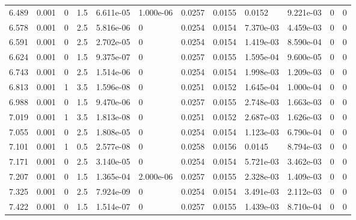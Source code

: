 \documentclass[preview]{standalone}
\begin{document}
{{{\begin{tabular}{L{1.2cm}C{1.2cm} C{0.3cm}C{0.5cm} C{1.4cm}C{1.4cm} C{1.4cm}C{1.4cm} C{1.6cm}C{1.6cm} C{1.6cm}C{1.6cm}}
  6.489  &  0.001  & 0     & 1.5 &  6.611e-05  & 1.000e-06  &  0.0257&   0.0155& 0.0152 & 9.221e-03   &  0 & 0  \\ 
  6.578  &  0.001  & 0     & 2.5 &  5.816e-06  & 0  &  0.0254&   0.0154& 7.370e-03 & 4.459e-03   &  0 & 0  \\ 
  6.591  &  0.001  & 0     & 2.5 &  2.702e-05  & 0  &  0.0254&   0.0154& 1.419e-03 & 8.590e-04   &  0 & 0  \\ 
  6.624  &  0.001  & 0     & 1.5 &  9.375e-07  & 0  &  0.0257&   0.0155& 1.595e-04 & 9.600e-05   &  0 & 0  \\ 
  6.743  &  0.001  & 0     & 2.5 &  1.514e-06  & 0  &  0.0254&   0.0154& 1.998e-03 & 1.209e-03   &  0 & 0  \\ 
  6.813  &  0.001  & 1     & 3.5 &  1.596e-08  & 0  &  0.0251&   0.0152& 1.645e-04 & 1.000e-04   &  0 & 0  \\ 
  6.988  &  0.001  & 0     & 1.5 &  9.470e-06  & 0  &  0.0257&   0.0155& 2.748e-03 & 1.663e-03   &  0 & 0  \\ 
  7.019  &  0.001  & 1     & 3.5 &  1.813e-08  & 0  &  0.0251&   0.0152& 2.687e-03 & 1.626e-03   &  0 & 0  \\ 
  7.055  &  0.001  & 0     & 2.5 &  1.808e-05  & 0  &  0.0254&   0.0154& 1.123e-03 & 6.790e-04   &  0 & 0  \\ 
  7.101  &  0.001  & 1     & 0.5 &  2.577e-08  & 0  &  0.0258&   0.0156& 0.0145 & 8.794e-03   &  0 & 0  \\ 
  7.171  &  0.001  & 0     & 2.5 &  3.140e-05  & 0  &  0.0254&   0.0154& 5.721e-03 & 3.462e-03   &  0 & 0  \\ 
  7.207  &  0.001  & 0     & 1.5 &  1.365e-04  & 2.000e-06  &  0.0257&   0.0155& 2.328e-03 & 1.409e-03   &  0 & 0  \\ 
  7.325  &  0.001  & 0     & 2.5 &  7.924e-09  & 0  &  0.0254&   0.0154& 3.491e-03 & 2.112e-03   &  0 & 0  \\ 
  7.422  &  0.001  & 0     & 1.5 &  1.514e-07  & 0  &  0.0257&   0.0155& 1.439e-03 & 8.710e-04   &  0 & 0  \\ 
\hline 
\end{tabular} 

}}}
\end{document}
